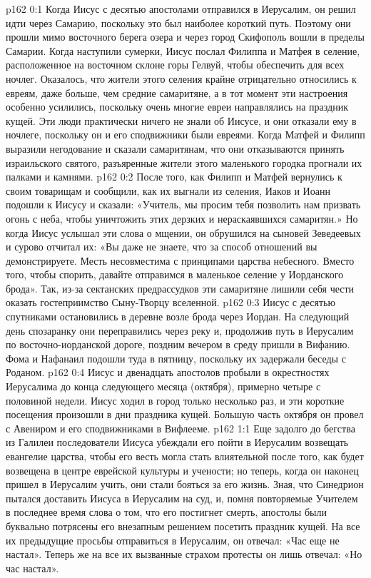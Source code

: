\author{Комиссия срединников}
\vs p162 0:1 Когда Иисус с десятью апостолами отправился в Иерусалим, он решил идти через Самарию, поскольку это был наиболее короткий путь. Поэтому они прошли мимо восточного берега озера и через город Скифополь вошли в пределы Самарии. Когда наступили сумерки, Иисус послал Филиппа и Матфея в селение, расположенное на восточном склоне горы Гелвуй, чтобы обеспечить для всех ночлег. Оказалось, что жители этого селения крайне отрицательно относились к евреям, даже больше, чем средние самаритяне, а в тот момент эти настроения особенно усилились, поскольку очень многие евреи направлялись на праздник кущей. Эти люди практически ничего не знали об Иисусе, и они отказали ему в ночлеге, поскольку он и его сподвижники были евреями. Когда Матфей и Филипп выразили негодование и сказали самаритянам, что они отказываются принять израильского святого, разъяренные жители этого маленького городка прогнали их палками и камнями.
\vs p162 0:2 После того, как Филипп и Матфей вернулись к своим товарищам и сообщили, как их выгнали из селения, Иаков и Иоанн подошли к Иисусу и сказали: «Учитель, мы просим тебя позволить нам призвать огонь с неба, чтобы уничтожить этих дерзких и нераскаявшихся самаритян.» Но когда Иисус услышал эти слова о мщении, он обрушился на сыновей Зеведеевых и сурово отчитал их: «Вы даже не знаете, что за способ отношений вы демонстрируете. Месть несовместима с принципами царства небесного. Вместо того, чтобы спорить, давайте отправимся в маленькое селение у Иорданского брода». Так, из\hyp{}за сектанских предрассудков эти самаритяне лишили себя чести оказать гостеприимство Сыну\hyp{}Творцу вселенной.
\vs p162 0:3 Иисус с десятью спутниками остановились в деревне возле брода через Иордан. На следующий день спозаранку они переправились через реку и, продолжив путь в Иерусалим по восточно\hyp{}иорданской дороге, поздним вечером в среду пришли в Вифанию. Фома и Нафанаил подошли туда в пятницу, поскольку их задержали беседы с Роданом.
\vs p162 0:4 \pc Иисус и двенадцать апостолов пробыли в окрестностях Иерусалима до конца следующего месяца (октября), примерно четыре с половиной недели. Иисус ходил в город только несколько раз, и эти короткие посещения произошли в дни праздника кущей. Большую часть октября он провел с Авениром и его сподвижниками в Вифлееме.
\vs p162 1:1 Еще задолго до бегства из Галилеи последователи Иисуса убеждали его пойти в Иерусалим возвещать евангелие царства, чтобы его весть могла стать влиятельной после того, как будет возвещена в центре еврейской культуры и учености; но теперь, когда он наконец пришел в Иерусалим учить, они стали бояться за его жизнь. Зная, что Синедрион пытался доставить Иисуса в Иерусалим на суд, и, помня повторяемые Учителем в последнее время слова о том, что его постигнет смерть, апостолы были буквально потрясены его внезапным решением посетить праздник кущей. На все их предыдущие просьбы отправиться в Иерусалим, он отвечал: «Час еще не настал». Теперь же на все их вызванные страхом протесты он лишь отвечал: «Но час настал».
